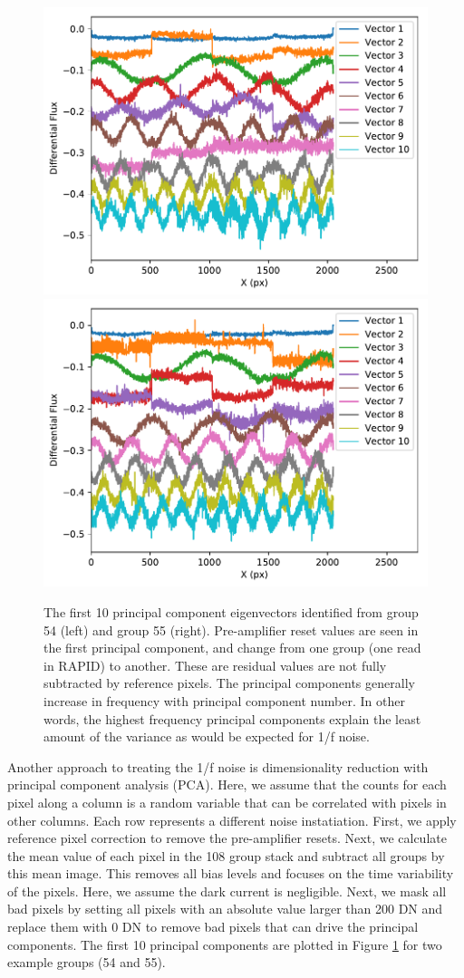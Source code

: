 \documentclass[]{aastex62}
\begin{document}
\begin{figure}[!hbtp]
\centering
\includegraphics[width=.4\columnwidth]{pca_dark_amp_all_extra_bias_sub_grp_54.pdf}
\includegraphics[width=.4\columnwidth]{pca_dark_amp_all_extra_bias_sub_grp_55.pdf}
\caption{The first 10 principal component eigenvectors identified from group 54 (left) and group 55 (right).
Pre-amplifier reset values are seen in the first principal component, and change from one group (one read in RAPID) to another.
These are residual values are not fully subtracted by reference pixels.
The principal components generally increase in frequency with principal component number.
In other words, the highest frequency principal components explain the least amount of the variance as would be expected for 1/f noise.
}\label{fig:pcaEigenvectors}
\end{figure}

Another approach to treating the 1/f noise is dimensionality reduction with principal component analysis (PCA).
Here, we assume that the counts for each pixel along a column is a random variable that can be correlated with pixels in other columns.
Each row represents a different noise instatiation.
First, we apply reference pixel correction to remove the pre-amplifier resets.
Next, we calculate the mean value of each pixel in the 108 group stack and subtract all groups by this mean image.
This removes all bias levels and focuses on the time variability of the pixels.
Here, we assume the dark current is negligible.
Next, we mask all bad pixels by setting all pixels with an absolute value larger than 200 DN and replace them with 0 DN to remove bad pixels that can drive the principal components.
The first 10 principal components are plotted in Figure \ref{fig:pcaEigenvectors} for two example groups (54 and 55).
\end{document}
